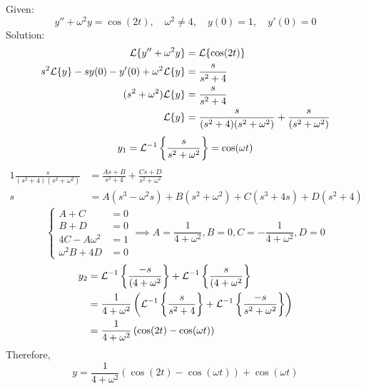 \documentclass[diffeq.tex]{subfiles}
\begin{document}
\begin{homework*}[255.15]
    Given:
    \begin{equation}
        y'' + \omega^{2}y = \cos(2t),\quad \omega^{2} \neq 4,\quad y(0) = 1,\quad y'(0) = 0
    \end{equation}
    Solution:
    \begin{alignat}{1}
        \mathcal{L}\{y'' + \omega^{2}y\} &= \mathcal{L}\{\cos(2t)\}\\
        s^{2}\mathcal{L}\{y\} - sy(0) - y'(0) + \omega^{2}\mathcal{L}\{y\} &= \frac{s}{s^{2} + 4}\\
        (s^{2} + \omega^{2})\mathcal{L}\{y\} &= \frac{s}{s^{2} + 4}\\
        \mathcal{L}\{y\} &= \frac{s}{(s^{2} + 4)(s^{2} + \omega^{2})} + \frac{s}{(s^{2} + \omega^{2})}
    \end{alignat}
    \begin{equation}
        y_{1} = \mathcal{L}^{-1}\left\{\frac{s}{s^{2} + \omega^{2}}\right\} = \cos(\omega t)
    \end{equation}
    \begin{alignat}{1}
        \frac{s}{(s^{2} + 4)(s^{2} + \omega^{2})} &= \frac{As + B}{s^{2} + 4} + \frac{Cs + D}{s^{2} + \omega^{2}}\\
        s &= A(s^{3} - \omega^{2}s) + B(s^{2} + \omega^{2}) + C(s^{3} + 4s) + D(s^{2} + 4)
    \end{alignat}
    \begin{equation}
        \begin{cases}
            A + C &= 0\\
            B + D &= 0\\
            4C - A\omega^{2} &= 1\\
            \omega^{2}B + 4D &= 0
        \end{cases}
        \implies A = \frac{1}{4 + \omega^{2}}, B = 0, C = -\frac{1}{4 + \omega^{2}}, D = 0
    \end{equation}
    \begin{alignat}{1}
        y_{2} &= \mathcal{L}^{-1}\left\{\frac{-s}{(4 + \omega^{2}}\right\} + \mathcal{L}^{-1}\left\{\frac{s}{(4 + \omega^{2}}\right\}\\
        &= \frac{1}{4 + \omega^{2}}\left(\mathcal{L}^{-1}\left\{\frac{s}{s^{2} + 4}\right\} + \mathcal{L}^{-1}\left\{\frac{-s}{s^{2} + \omega^{2}}\right\}\right)\\
        &= \frac{1}{4 + \omega^{2}}\left(\cos(2t) - \cos(\omega t)\right)\\
    \end{alignat}
    Therefore,
    \begin{equation}
        y = \frac{1}{4 + \omega^{2}}\left(\cos(2t) - \cos(\omega t)\right) + \cos(\omega t)
    \end{equation}
\end{homework*}
\end{document}
